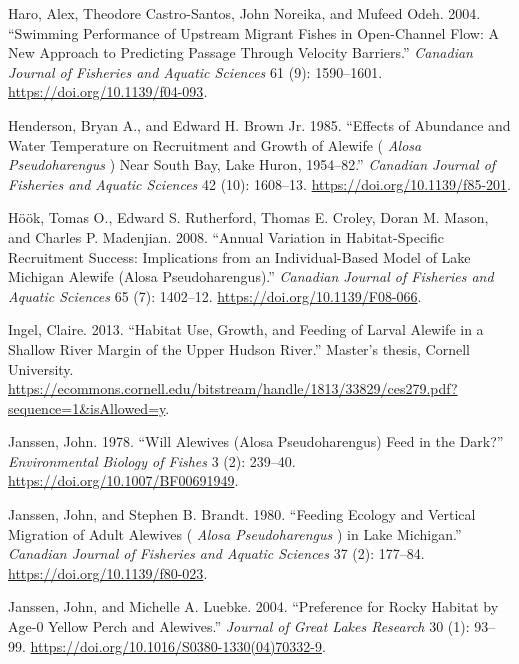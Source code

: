 \documentclass[
]{book}
\newlength{\cslhangindent}
\newlength{\cslentryspacingunit} %
\newenvironment{CSLReferences}[2] %
 {%
  \setlength{\parindent}{0pt}
  \ifodd #1
  \let\oldpar\par
  \def\par{\hangindent=\cslhangindent\oldpar}
  \fi
  \setlength{\parskip}{#2\cslentryspacingunit}
 }%
 {}
\begin{document}
\begin{CSLReferences}{1}{0}
\leavevmode{}%
Haro, Alex, Theodore Castro-Santos, John Noreika, and Mufeed Odeh. 2004. {``Swimming Performance of Upstream Migrant Fishes in Open-Channel Flow: A New Approach to Predicting Passage Through Velocity Barriers.''} \emph{Canadian Journal of Fisheries and Aquatic Sciences} 61 (9): 1590--1601. \url{https://doi.org/10.1139/f04-093}.

\leavevmode{}%
Henderson, Bryan A., and Edward H. Brown Jr. 1985. {``Effects of {Abundance} and {Water} {Temperature} on {Recruitment} and {Growth} of {Alewife} ( \emph{{Alosa} Pseudoharengus} ) Near {South} {Bay}, {Lake} {Huron}, 1954--82.''} \emph{Canadian Journal of Fisheries and Aquatic Sciences} 42 (10): 1608--13. \url{https://doi.org/10.1139/f85-201}.

\leavevmode{}%
Höök, Tomas O., Edward S. Rutherford, Thomas E. Croley, Doran M. Mason, and Charles P. Madenjian. 2008. {``Annual Variation in Habitat-Specific Recruitment Success: Implications from an Individual-Based Model of {Lake} {Michigan} Alewife ({Alosa} Pseudoharengus).''} \emph{Canadian Journal of Fisheries and Aquatic Sciences} 65 (7): 1402--12. \url{https://doi.org/10.1139/F08-066}.

\leavevmode{}%
Ingel, Claire. 2013. {``Habitat {Use}, {Growth}, and {Feeding} of {Larval} {Alewife} in a {Shallow} {River} {Margin} of the {Upper} {Hudson} {River}.''} Master's thesis, Cornell University. \url{https://ecommons.cornell.edu/bitstream/handle/1813/33829/ces279.pdf?sequence=1\&isAllowed=y}.

\leavevmode{}%
Janssen, John. 1978. {``Will Alewives ({Alosa} Pseudoharengus) Feed in the Dark?''} \emph{Environmental Biology of Fishes} 3 (2): 239--40. \url{https://doi.org/10.1007/BF00691949}.

\leavevmode{}%
Janssen, John, and Stephen B. Brandt. 1980. {``Feeding {Ecology} and {Vertical} {Migration} of {Adult} {Alewives} ( \emph{{Alosa} Pseudoharengus} ) in {Lake} {Michigan}.''} \emph{Canadian Journal of Fisheries and Aquatic Sciences} 37 (2): 177--84. \url{https://doi.org/10.1139/f80-023}.

\leavevmode{}%
Janssen, John, and Michelle A. Luebke. 2004. {``Preference for {Rocky} {Habitat} by {Age}-0 {Yellow} {Perch} and {Alewives}.''} \emph{Journal of Great Lakes Research} 30 (1): 93--99. \url{https://doi.org/10.1016/S0380-1330(04)70332-9}.


\end{CSLReferences}
\end{document}
